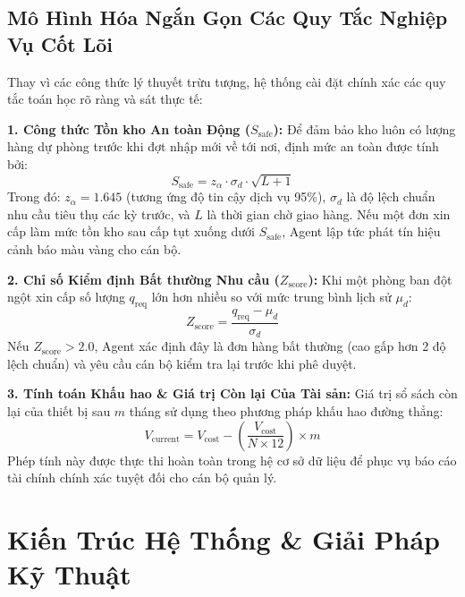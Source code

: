 \documentclass[11pt,a4paper]{article}
\begin{document}
\subsection{Mô Hình Hóa Ngắn Gọn Các Quy Tắc Nghiệp Vụ Cốt Lõi}
Thay vì các công thức lý thuyết trừu tượng, hệ thống cài đặt chính xác các quy tắc toán học rõ ràng và sát thực tế:

\textbf{1. Công thức Tồn kho An toàn Động ($S_{\text{safe}}$):}
Để đảm bảo kho luôn có lượng hàng dự phòng trước khi đợt nhập mới về tới nơi, định mức an toàn được tính bởi:
\begin{equation}
    S_{\text{safe}} = z_{\alpha} \cdot \sigma_d \cdot \sqrt{L + 1}
\end{equation}
Trong đó: $z_{\alpha} = 1.645$ (tương ứng độ tin cậy dịch vụ 95\%), $\sigma_d$ là độ lệch chuẩn nhu cầu tiêu thụ các kỳ trước, và $L$ là thời gian chờ giao hàng. Nếu một đơn xin cấp làm mức tồn kho sau cấp tụt xuống dưới $S_{\text{safe}}$, Agent lập tức phát tín hiệu cảnh báo màu vàng cho cán bộ.

\textbf{2. Chỉ số Kiểm định Bất thường Nhu cầu ($Z_{\text{score}}$):}
Khi một phòng ban đột ngột xin cấp số lượng $q_{\text{req}}$ lớn hơn nhiều so với mức trung bình lịch sử $\mu_d$:
\begin{equation}
    Z_{\text{score}} = \frac{q_{\text{req}} - \mu_d}{\sigma_d}
\end{equation}
Nếu $Z_{\text{score}} > 2.0$, Agent xác định đây là đơn hàng bất thường (cao gấp hơn 2 độ lệch chuẩn) và yêu cầu cán bộ kiểm tra lại trước khi phê duyệt.

\textbf{3. Tính toán Khấu hao \& Giá trị Còn lại Của Tài sản:}
Giá trị sổ sách còn lại của thiết bị sau $m$ tháng sử dụng theo phương pháp khấu hao đường thẳng:
\begin{equation}
    V_{\text{current}} = V_{\text{cost}} - \left( \frac{V_{\text{cost}}}{N \times 12} \right) \times m
\end{equation}
Phép tính này được thực thi hoàn toàn trong hệ cơ sở dữ liệu để phục vụ báo cáo tài chính chính xác tuyệt đối cho cán bộ quản lý.

\newpage

\section{Kiến Trúc Hệ Thống \& Giải Pháp Kỹ Thuật}
\end{document}
